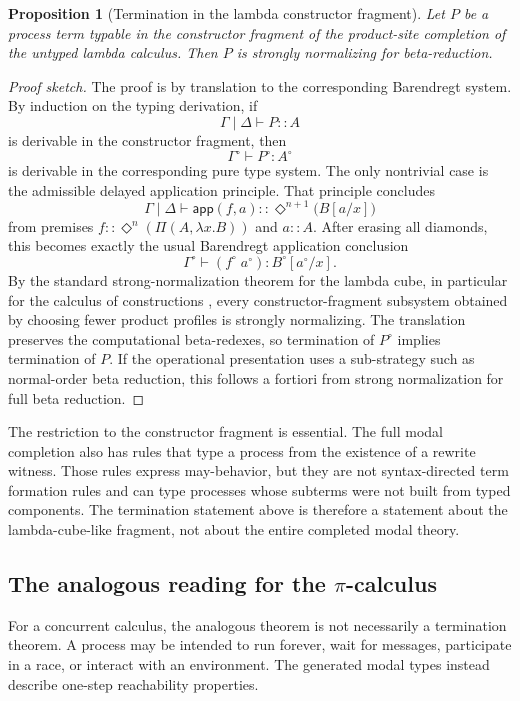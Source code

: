\documentclass[11pt]{article}
\newcommand{\ty}{\mathrel{::}}
\newcommand{\dep}{\mathsf{\Pi}}
\newcommand{\app}{\mathsf{app}}
\newcommand{\Dia}{\Diamond}
\newtheorem{proposition}[definition]{Proposition}
\begin{document}
\begin{proposition}[Termination in the lambda constructor fragment]
Let \(P\) be a process term typable in the constructor fragment of the product-site completion of the untyped lambda calculus.  Then \(P\) is strongly normalizing for beta-reduction.
\end{proposition}

\begin{proof}[Proof sketch]
The proof is by translation to the corresponding Barendregt system.  By
induction on the typing derivation, if
\[
  \Gamma\mid\Delta\vdash P\ty A
\]
is derivable in the constructor fragment, then
\[
  \Gamma^\circ\vdash P^\circ : A^\circ
\]
is derivable in the corresponding pure type system.  The only nontrivial case
is the admissible delayed application principle.  That principle concludes
\[
  \Gamma\mid\Delta\vdash \app(f,a)\ty\Dia^{n+1}\bigl(B[a/x]\bigr)
\]
from premises \(f\ty\Dia^n(\dep(A,\lambda x.B))\) and \(a\ty A\).
After erasing all diamonds, this becomes exactly the usual Barendregt
application conclusion
\[
  \Gamma^\circ\vdash
  (f^\circ \; a^\circ)
  :
  B^\circ[a^\circ/x].
\]
By the standard strong-normalization theorem for the lambda cube, in particular for the calculus of constructions \cite{Barendregt1991,Barendregt1992Types}, every
constructor-fragment subsystem obtained by choosing fewer product profiles is strongly
normalizing.  The translation preserves the computational beta-redexes, so
termination of \(P^\circ\) implies termination of \(P\).  If the operational
presentation uses a sub-strategy such as normal-order beta reduction, this
follows a fortiori from strong normalization for full beta reduction.
\end{proof}

The restriction to the constructor fragment is essential.  The full modal
completion also has rules that type a process from the existence of a rewrite
witness.  Those rules express may-behavior, but they are not syntax-directed
term formation rules and can type processes whose subterms were not built
from typed components.  The termination statement above is therefore a
statement about the lambda-cube-like fragment, not about the entire completed
modal theory.

\subsection{The analogous reading for the \texorpdfstring{\(\pi\)}{π}-calculus}

For a concurrent calculus, the analogous theorem is not necessarily a termination theorem. A process may be intended to run forever, wait for messages, participate in a race, or interact with an environment.  The generated modal types instead describe one-step reachability properties.
\end{document}
